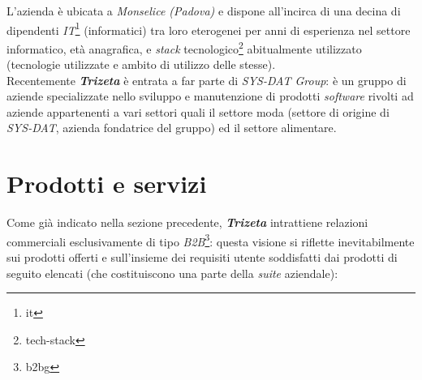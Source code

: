 L'azienda è ubicata a \textit{Monselice (Padova)} e dispone all'incirca di una decina di dipendenti \textit{IT}\footnote{\gls{it}} (informatici) tra loro eterogenei per anni di esperienza nel settore informatico, età anagrafica, e 
\textit{stack} tecnologico\footnote{\gls{tech-stack}} abitualmente utilizzato (tecnologie utilizzate e ambito di utilizzo delle stesse). \\
Recentemente \textit{\textbf{Trizeta}} è entrata a far parte di \textit{SYS-DAT Group}: è un gruppo di aziende specializzate nello sviluppo e manutenzione di prodotti \textit{software} rivolti ad aziende appartenenti a vari settori quali 
il settore moda (settore di origine di \textit{SYS-DAT}, azienda fondatrice del gruppo) ed il settore alimentare. 


\section{Prodotti e servizi}

Come già indicato nella sezione precedente, \textit{\textbf{Trizeta}} intrattiene relazioni commerciali esclusivamente di tipo \textit{B2B}\footnote{\gls{b2bg}}: questa visione si riflette inevitabilmente sui prodotti offerti
e sull'insieme dei requisiti utente soddisfatti dai prodotti di seguito elencati (che costituiscono una parte della \textit{suite} aziendale):

